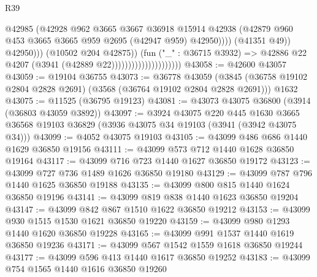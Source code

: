 \begin{lexlean}{R39}
\begin{coremodule}
                                                      @42985
                                                      (@42928
                                                        @962
                                                        @3665
                                                        @3667
                                                        @36918
                                                        @15914
                                                        @42938
                                                        (@42879
                                                          @960
                                                          @453
                                                          @3665
                                                          @3665
                                                          @959
                                                          @2695
                                                          (@42947 @959)
                                                          @42950))))
                                                  (@41351 @49))
                                                @42950)))
                                          (@10502 @204 @42875))
                                        (fun ("_" : @36715 @3932) =>
                                        @42886 @22 @4207 (@3941 (@42889 @22)))))))))))))))))))))
@43058 := @42600 @43057
@43059 := @19104 @36755
@43073 := @36778
    @43059
    (@3845 (@36758 @19102 @2804 @2828 @2691) (@3568 (@36764 @19102 @2804 @2828 @2691)))
    @1632
@43075 := @11525 (@36795 @19123)
@43081 := @43073 @43075 @36800 (@3914 (@36803 @43059 @3892))
@43097 := @3924
    @43075
    @220
    @445
    @1630
    @3665
    @36568
    @19103
    @36829
    (@3936 @43075 @34 @19103 (@3941 (@3942 @43075 @34)))
@43099 := @4052 @43075 @19103
@43105 := @43099 @486 @686 @1440 @1629 @36850 @19156
@43111 := @43099 @573 @712 @1440 @1628 @36850 @19164
@43117 := @43099 @716 @723 @1440 @1627 @36850 @19172
@43123 := @43099 @727 @736 @1489 @1626 @36850 @19180
@43129 := @43099 @787 @796 @1440 @1625 @36850 @19188
@43135 := @43099 @800 @815 @1440 @1624 @36850 @19196
@43141 := @43099 @819 @838 @1440 @1623 @36850 @19204
@43147 := @43099 @842 @867 @1510 @1622 @36850 @19212
@43153 := @43099 @930 @1515 @1530 @1621 @36850 @19220
@43159 := @43099 @980 @1293 @1440 @1620 @36850 @19228
@43165 := @43099 @991 @1537 @1440 @1619 @36850 @19236
@43171 := @43099 @567 @1542 @1559 @1618 @36850 @19244
@43177 := @43099 @596 @413 @1440 @1617 @36850 @19252
@43183 := @43099 @754 @1565 @1440 @1616 @36850 @19260

\end{coremodule}
\end{lexlean}
